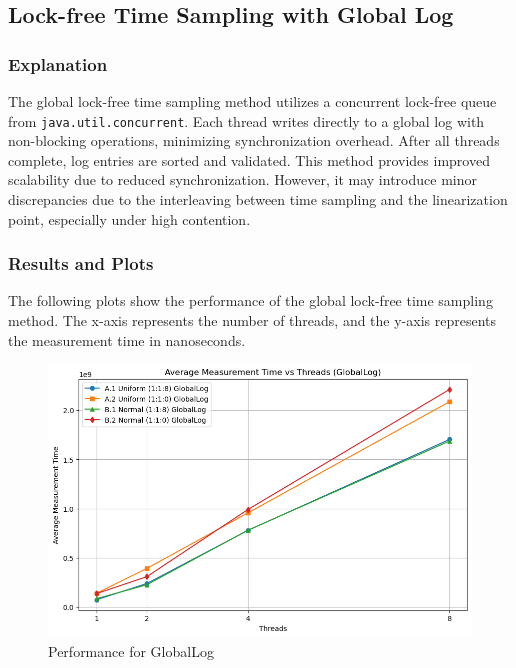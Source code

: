 \documentclass{article}
\begin{document}
\newpage
\subsection{Lock-free Time Sampling with Global Log}

\subsubsection{Explanation}
The global lock-free time sampling method utilizes a concurrent lock-free queue from \texttt{java.util.concurrent}. Each thread writes directly to a global log with non-blocking operations, minimizing synchronization overhead. After all threads complete, log entries are sorted and validated. This method provides improved scalability due to reduced synchronization. However, it may introduce minor discrepancies due to the interleaving between time sampling and the linearization point, especially under high contention.

\subsubsection{Results and Plots}
The following plots show the performance of the global lock-free time sampling method. The x-axis represents the number of threads, and the y-axis represents the measurement time in nanoseconds.

\begin{figure}[H]
    \centering
    \includegraphics[width=\textwidth]{LaTex/images/Lab 3 2.5.2.1.png}
    \caption{Performance for GlobalLog}
    \label{fig:global-log-1-1-8}
\end{figure}
\end{document}
